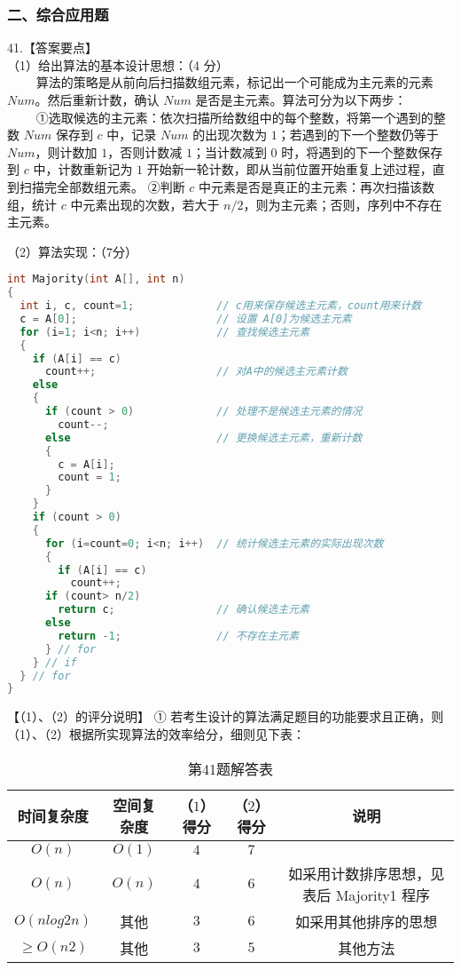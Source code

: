 \subsubsection{二、综合应用题}

41.【答案要点】 \\
（1）给出算法的基本设计思想：（4 分） \\
$\qquad$ 算法的策略是从前向后扫描数组元素，标记出一个可能成为主元素的元素 $Num$。然后重新计数，确认 $Num$ 是否是主元素。算法可分为以下两步： \\
$\qquad$ ①选取候选的主元素：依次扫描所给数组中的每个整数，将第一个遇到的整数 $Num$ 保存到 $c$ 中，记录 $Num$ 的出现次数为 $1$；若遇到的下一个整数仍等于 $Num$，则计数加 $1$，否则计数减 $1$；当计数减到 $0$ 时，将遇到的下一个整数保存到 $c$ 中，计数重新记为 $1$ 开始新一轮计数，即从当前位置开始重复上述过程，直到扫描完全部数组元素。 
②判断 $c$ 中元素是否是真正的主元素：再次扫描该数组，统计 $c$ 中元素出现的次数，若大于 $n/2$，则为主元素；否则，序列中不存在主元素。

（2）算法实现：（7分）
\begin{lstlisting}[language=cpp]
int Majority(int A[], int n)
{ 
  int i, c, count=1;             // c用来保存候选主元素，count用来计数
  c = A[0];                      // 设置 A[0]为候选主元素
  for (i=1; i<n; i++)            // 查找候选主元素
  {
    if (A[i] == c)
      count++;                   // 对A中的候选主元素计数
    else
    {
      if (count > 0)             // 处理不是候选主元素的情况
        count--;
      else                       // 更换候选主元素，重新计数
      {
        c = A[i]; 
        count = 1; 
      }
    }
    if (count > 0)
    {
      for (i=count=0; i<n; i++)  // 统计候选主元素的实际出现次数
      {
        if (A[i] == c)
          count++; 
      if (count> n/2)
        return c;                // 确认候选主元素
      else
        return -1;               // 不存在主元素 
      } // for
    } // if
  } // for
}
\end{lstlisting}

【（1）、（2）的评分说明】
① 若考生设计的算法满足题目的功能要求且正确，则（1）、（2）根据所实现算法的效率给分，细则见下表： 
\begin{table}[ht]
\centering
\caption{第41题解答表}\label{tab_CSN13_8}
\begin{tabular}{|c|c|c|c|c|}
\hline
时间复杂度 & 空间复杂度 & （$1$）得分 & （$2$）得分 & 说明  \\
\hline
$O(n)$ & $O(1)$ & $4$ & $7$ &  \\
\hline
$O(n)$ & $O(n)$ & $4$ & $6$ & 如采用计数排序思想，见表后 Majority1 程序  \\
\hline
$O(nlog2n)$ & 其他 & $3$ & $6$ & 如采用其他排序的思想  \\
\hline
$\geqslant O(n2)$ & 其他 & $3$ & $5$ & 其他方法  \\
\hline
\end{tabular}
\end{table}

